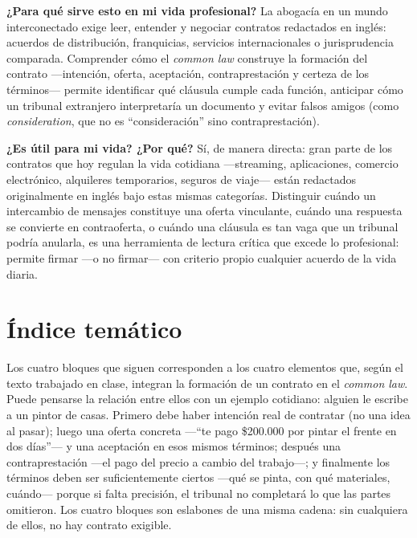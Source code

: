 \documentclass[12pt,oneside]{book}
\begin{document}
\begin{important}
\textbf{¿Para qué sirve esto en mi vida profesional?} La abogacía en un mundo interconectado exige leer, entender y negociar contratos redactados en inglés: acuerdos de distribución, franquicias, servicios internacionales o jurisprudencia comparada. Comprender cómo el \textit{common law} construye la formación del contrato —intención, oferta, aceptación, contraprestación y certeza de los términos— permite identificar qué cláusula cumple cada función, anticipar cómo un tribunal extranjero interpretaría un documento y evitar falsos amigos (como \textit{consideration}, que no es ``consideración'' sino contraprestación).

\textbf{¿Es útil para mi vida? ¿Por qué?} Sí, de manera directa: gran parte de los contratos que hoy regulan la vida cotidiana —streaming, aplicaciones, comercio electrónico, alquileres temporarios, seguros de viaje— están redactados originalmente en inglés bajo estas mismas categorías. Distinguir cuándo un intercambio de mensajes constituye una oferta vinculante, cuándo una respuesta se convierte en contraoferta, o cuándo una cláusula es tan vaga que un tribunal podría anularla, es una herramienta de lectura crítica que excede lo profesional: permite firmar —o no firmar— con criterio propio cualquier acuerdo de la vida diaria.
\end{important}

\section*{Índice temático}

Los cuatro bloques que siguen corresponden a los cuatro elementos que, según el texto trabajado en clase, integran la formación de un contrato en el \textit{common law}. Puede pensarse la relación entre ellos con un ejemplo cotidiano: alguien le escribe a un pintor de casas. Primero debe haber intención real de contratar (no una idea al pasar); luego una oferta concreta —``te pago \$200.000 por pintar el frente en dos días''— y una aceptación en esos mismos términos; después una contraprestación —el pago del precio a cambio del trabajo—; y finalmente los términos deben ser suficientemente ciertos —qué se pinta, con qué materiales, cuándo— porque si falta precisión, el tribunal no completará lo que las partes omitieron. Los cuatro bloques son eslabones de una misma cadena: sin cualquiera de ellos, no hay contrato exigible.
\end{document}
